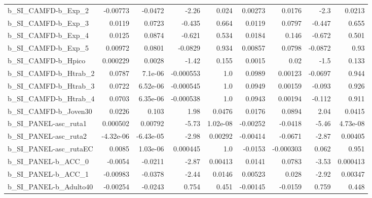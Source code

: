 \begin{tabular}{lrrrrrrrr}
b\_SI\_CAMFD-b\_Exp\_2         &    -0.00773 &      -0.0472 &     -2.26 &    0.024 &    0.00273 &      0.0176 &         -2.3 &        0.0213 \\
b\_SI\_CAMFD-b\_Exp\_3         &      0.0119 &       0.0723 &    -0.435 &    0.664 &     0.0119 &      0.0797 &       -0.447 &         0.655 \\
b\_SI\_CAMFD-b\_Exp\_4         &      0.0125 &       0.0874 &    -0.621 &    0.534 &     0.0184 &       0.146 &       -0.672 &         0.501 \\
b\_SI\_CAMFD-b\_Exp\_5         &     0.00972 &       0.0801 &   -0.0829 &    0.934 &    0.00857 &      0.0798 &      -0.0872 &          0.93 \\
b\_SI\_CAMFD-b\_Hpico         &    0.000229 &       0.0028 &     -1.42 &    0.155 &     0.0015 &        0.02 &         -1.5 &         0.133 \\
b\_SI\_CAMFD-b\_Htrab\_2       &      0.0787 &      7.1e-06 & -0.000553 &      1.0 &     0.0989 &     0.00123 &      -0.0697 &         0.944 \\
b\_SI\_CAMFD-b\_Htrab\_3       &      0.0722 &     6.52e-06 & -0.000545 &      1.0 &     0.0949 &     0.00159 &       -0.093 &         0.926 \\
b\_SI\_CAMFD-b\_Htrab\_4       &      0.0703 &     6.35e-06 & -0.000538 &      1.0 &     0.0943 &     0.00194 &       -0.112 &         0.911 \\
b\_SI\_CAMFD-b\_Joven30       &      0.0226 &        0.103 &      1.98 &   0.0476 &     0.0176 &      0.0894 &         2.04 &        0.0415 \\
b\_SI\_PANEL-asc\_ruta1       &    0.000502 &      0.00792 &     -5.73 & 1.02e-08 &   -0.00252 &     -0.0418 &        -5.46 &      4.73e-08 \\
b\_SI\_PANEL-asc\_ruta2       &   -4.32e-06 &    -6.43e-05 &     -2.98 &  0.00292 &   -0.00414 &     -0.0671 &        -2.87 &       0.00405 \\
b\_SI\_PANEL-asc\_rutaEC      &      0.0085 &     1.03e-06 &  0.000445 &      1.0 &    -0.0153 &   -0.000303 &        0.062 &         0.951 \\
b\_SI\_PANEL-b\_ACC\_0         &     -0.0054 &      -0.0211 &     -2.87 &  0.00413 &     0.0141 &      0.0783 &        -3.53 &      0.000413 \\
b\_SI\_PANEL-b\_ACC\_1         &    -0.00983 &      -0.0378 &     -2.44 &   0.0146 &    0.00523 &       0.028 &        -2.92 &       0.00347 \\
b\_SI\_PANEL-b\_Adulto40      &    -0.00254 &      -0.0243 &     0.754 &    0.451 &   -0.00145 &     -0.0159 &        0.759 &         0.448 \\

\end{tabular}
